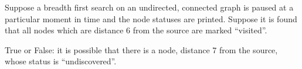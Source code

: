 \Needspace{3in}
\begin{prob}

    Suppose a breadth first search on an undirected, connected graph is paused
    at a particular moment in time and the node statuses are printed.
    Suppose it is found that all nodes which are distance 6 from the source are marked
    ``visited''.

    True or False: it is possible that there is a node, distance 7 from the source,
    whose status is ``undiscovered''.

    \tF{}

\end{prob}

